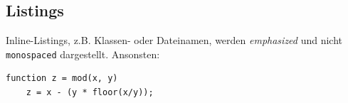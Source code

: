 \clearpage
\subsection{Listings}

Inline-Listings, z.B. Klassen- oder Dateinamen, werden \emph{emphasized} und nicht \texttt{monospaced} dargestellt. Ansonsten:

\begin{lstlisting}[caption={MATLAB-konforme Modulo-Funktion.},label={listing:mod}]
	function z = mod(x, y)
	z = x - (y * floor(x/y));
\end{lstlisting}
